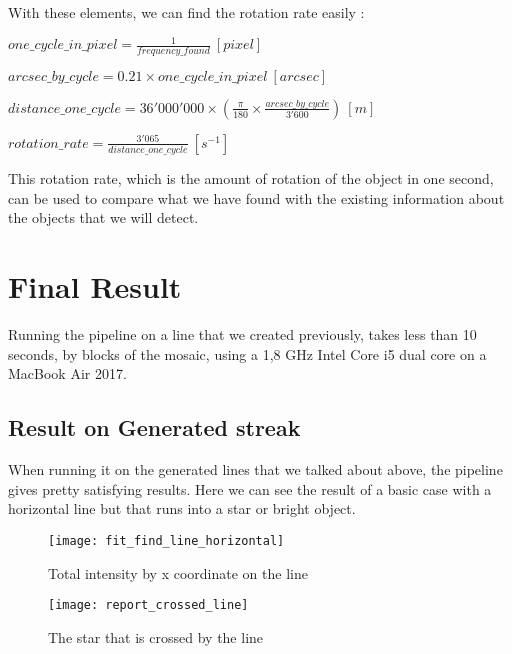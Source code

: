 \documentclass[a4paper,12pt,oneside]{report}
\begin{document}
With these elements, we can find the rotation rate easily :
\begin{center}
$one\_cycle\_in\_pixel = \frac{1}{frequency\_found}\ [pixel]$

$arcsec\_by\_cycle = 0.21 \times one\_cycle\_in\_pixel\ [arcsec]$

$distance\_one\_cycle = 36'000'000 \times (\frac{\pi}{180} \times \frac{arcsec\_by\_cycle}{3'600})\ [m]$

$rotation\_rate = \frac{3'065}{distance\_one\_cycle}\ [s^{-1}]$
\end{center}
This rotation rate, which is the amount of rotation of the object in one second, can be used to compare what we have found with 
the existing information about the objects that we will detect.




\chapter{Final Result}


Running the pipeline on a line that we created previously, takes less than 10 seconds, by blocks of the mosaic, using a 1,8 GHz Intel Core i5 dual core
on a MacBook Air 2017. 

\section{Result on Generated streak}
When running it on the generated lines that we talked about above, the pipeline gives pretty satisfying results. Here we can see the result 
of a basic case with a horizontal line but that  runs into a star or bright object.
\begin{figure}[h]
    \begin{minipage}[c]{.47\linewidth}
        \centering
        \texttt{[image: fit\_find\_line\_horizontal]}
        \caption{Total intensity by x coordinate on the line}
        \label{graphHorizontalLine}
    \end{minipage}
    \hfill
    \begin{minipage}[c]{.47\linewidth}
        \centering
        \texttt{[image: report\_crossed\_line]}
        \caption{The star that is crossed by the line}
    \end{minipage}
\end{figure}
\end{document}
